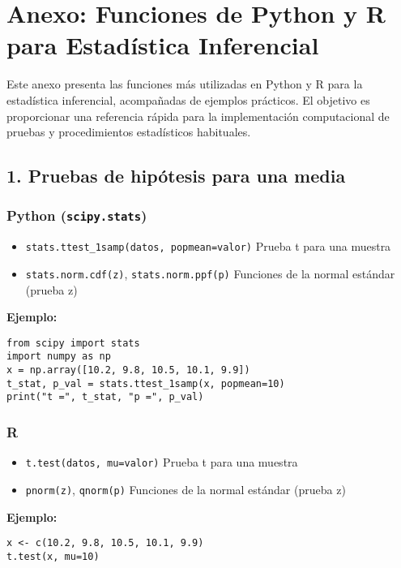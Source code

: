 \chapter{Anexo: Funciones de Python y R para Estadística Inferencial}

Este anexo presenta las funciones más utilizadas en Python y R para la estadística inferencial, acompañadas de ejemplos prácticos. El objetivo es proporcionar una referencia rápida para la implementación computacional de pruebas y procedimientos estadísticos habituales.

\section{1. Pruebas de hipótesis para una media}

\subsection*{Python (\texttt{scipy.stats})}
\begin{itemize}
    \item \texttt{stats.ttest\_1samp(datos, popmean=valor)} \hfill Prueba t para una muestra
    \item \texttt{stats.norm.cdf(z)}, \texttt{stats.norm.ppf(p)} \hfill Funciones de la normal estándar (prueba z)
\end{itemize}

\textbf{Ejemplo:}
\begin{verbatim}
from scipy import stats
import numpy as np
x = np.array([10.2, 9.8, 10.5, 10.1, 9.9])
t_stat, p_val = stats.ttest_1samp(x, popmean=10)
print("t =", t_stat, "p =", p_val)
\end{verbatim}

\subsection*{R}
\begin{itemize}
    \item \texttt{t.test(datos, mu=valor)} \hfill Prueba t para una muestra
    \item \texttt{pnorm(z)}, \texttt{qnorm(p)} \hfill Funciones de la normal estándar (prueba z)
\end{itemize}

\textbf{Ejemplo:}
\begin{verbatim}
x <- c(10.2, 9.8, 10.5, 10.1, 9.9)
t.test(x, mu=10)
\end{verbatim}


